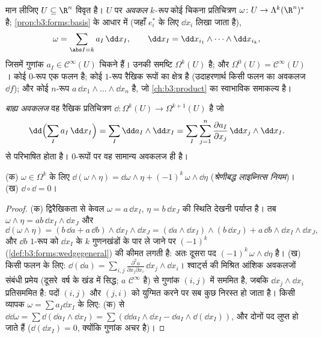 \begin{definition}\label{def:b3:forms:diffform}
मान लीजिए $U \subseteq \R^n$ विवृत है। $U$ पर \emph{अवकल
$k$-रूप} कोई चिकना प्रतिचित्रण $\omega\colon U \to \Lambda^k(\R^n)^*$ है; \cref{prop:b3:forms:basis}
के आधार में (जहाँ $e_i^*$ के लिए $\dd x_i$ लिखा जाता है),
\[
\omega = \sum_{\abs I = k} a_I\,\dd x_I,
\qquad
\dd x_I = \dd x_{i_1} \wedge \dots \wedge \dd x_{i_k},
\]
जिसमें गुणांक $a_I \in \mathcal C^\infty(U)$ चिकने हैं। उनकी समष्टि $\Omega^k(U)$ है; और $\Omega^0(U) = \mathcal
C^\infty(U)$।
कोई $0$-रूप एक फलन है; कोई $1$-रूप रैखिक रूपों का क्षेत्र है
(उदाहरणार्थ किसी फलन का अवकलज $\dd f$); और कोई $n$-रूप $a\,\dd x_1\wedge\dots\wedge\dd
x_n$ है,
जो \cref{ch:b3:product} का स्वाभाविक समाकल्य है।
\end{definition}

\begin{definition}[बाह्य अवकलज]\label{def:b3:forms:d}
\emph{बाह्य अवकलज} वह रैखिक प्रतिचित्रण $\dd\colon \Omega^k(U) \to \Omega^{k+1}(U)$
है जो
\[
\dd\Bigl(\sum_I a_I\,\dd x_I\Bigr)
= \sum_I \dd a_I \wedge \dd x_I
= \sum_I\sum_{j=1}^n \frac{\partial a_I}{\partial
x_j}\,\dd x_j \wedge \dd x_I .
\]
से परिभाषित होता है। $0$-रूपों पर वह सामान्य अवकलज ही है।
\end{definition}

\begin{theorem}\label{thm:b3:forms:dsquare}
(क) $\omega \in \Omega^k$ के लिए $\dd(\omega \wedge \eta) = \dd\omega \wedge \eta +
(-1)^k\,\omega \wedge \dd\eta$ (\emph{श्रेणीबद्ध लाइब्नित्स नियम})।
(ख) $\dd \circ \dd = 0$।
\end{theorem}

\begin{proof}
(क) द्विरैखिकता से केवल $\omega = a\,\dd
x_I$, $\eta = b\,\dd x_J$ की स्थिति देखनी पर्याप्त है।
तब $\omega \wedge \eta =
ab\,\dd x_I \wedge \dd x_J$ और
\[
\dd(\omega\wedge\eta) = (b\,\dd a + a\,\dd b) \wedge \dd x_I
\wedge \dd x_J
= (\dd a \wedge \dd x_I) \wedge (b\,\dd x_J) +
a\,\dd b \wedge \dd x_I \wedge \dd x_J,
\]
और $\dd b$ $1$-रूप को $\dd
x_I$ के $k$ गुणनखंडों के पार ले जाने पर
$(-1)^k$ (\cref{def:b3:forms:wedgegeneral}) की कीमत लगती है: अतः दूसरा पद $(-1)^k\,\omega \wedge \dd\eta$ है।
(ख) किसी फलन के लिए: $\dd(\dd a) = \sum_{i,j}
\frac{\partial^2a}{\partial x_j\partial x_i}\,\dd x_j \wedge
\dd x_i$। श्वार्ट्स की मिश्रित आंशिक अवकलजों
संबंधी प्रमेय (दूसरे~वर्ष के खंड में सिद्ध; $a$ $\mathcal C^\infty$ है) से
गुणांक $(i,j)$ में सममित है, जबकि $\dd x_j \wedge
\dd x_i$ प्रतिसममित है: पदों $(i,j)$
और $(j,i)$ को युग्मित करने पर सब कुछ निरस्त हो जाता है। किसी व्यापक
$\omega = \sum
a_I\dd x_I$ के लिए: (क) से $\dd\dd\omega = \sum\dd(\dd a_I \wedge \dd x_I)
= \sum(\dd\dd a_I\wedge\dd x_I - \dd a_I\wedge\dd(\dd x_I))$, और दोनों पद लुप्त हो जाते हैं ($\dd(\dd x_I) = 0$,
क्योंकि गुणांक अचर है)।
\end{proof}

